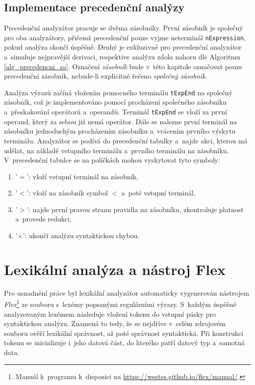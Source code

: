 \subsection*{Implementace precedenční analýzy}
Precedenční analyzátor pracuje se dvěma zásobníky.
První zásobník je společný pro oba analyzátory, přičemž precedenční pouze vyjme neterminál \texttt{nExpression}, pokud analýza skončí úspěšně.
Druhý je exkluzivně pro precedenční analyzátor a~simuluje nejpravější derivaci, respektive analýzu zdola nahoru dle Algoritmu \ref{alg_precedencni_sa}.
Označení \emph{zásobník} bude v~této kapitole označovat pouze precedenční zásobník, nebude-li explicitně řečeno \emph{společný zásobník}.

Analýza výrazů začíná vložením pomocného terminálu \texttt{tExpEnd} na společný zásobník, což je implementováno pomocí procházení společného zásobníku a~přeskakování operátorů a~operandů.
Terminál \texttt{tExpEnd} se vloží za první operand, který za sebou již nemá operátor.
Dále se nalezne první terminál na zásobníku jednoduchým procházením zásobníku a~vrácením prvního výskytu terminálu.
Analyzátor se podívá do precedenční tabulky a~najde akci, kterou má udělat, na základě vstupního terminálu a~prvního terminálu na zásobníku.
V~precedenční tabulce se na políčkách mohou vyskytovat tyto symboly:
\begin{enumerate}[label=\arabic*)]
    \item '$=$': vloží vstupní terminál na zásobník,
    \item '$<$': vloží na zásobník symbol $<$ a~poté vstupní terminál,
    \item '$>$': najde první pravou stranu pravidla na zásobníku, zkontroluje platnost a~provede redukci,
    \item '$\times$': ukončí analýzu syntaktickou chybou.
\end{enumerate}

\section{Lexikální analýza a nástroj Flex}
Pro usnadnění práce byl lexikální analyzátor automaticky vygenerován nástrojem \emph{Flex}\footnote{Manuál k~programu k~dispozici na \href{https://westes.github.io/flex/manual/}{https://westes.github.io/flex/manual/}.} ze souboru s~lexémy popsanými regulárními výrazy.
S~každým úspěšně analyzovaným lexémem následuje vložení tokenu do vstupní pásky pro syntaktickou analýzu.
Znamená to tedy, že se nejdříve v~celém zdrojovém souboru ověří lexikální správnost, až poté správnost syntaktická. 
Při konstrukci tokenu se inicializuje i~jeho datová část, do kterého patří datový typ a~samotná data.

